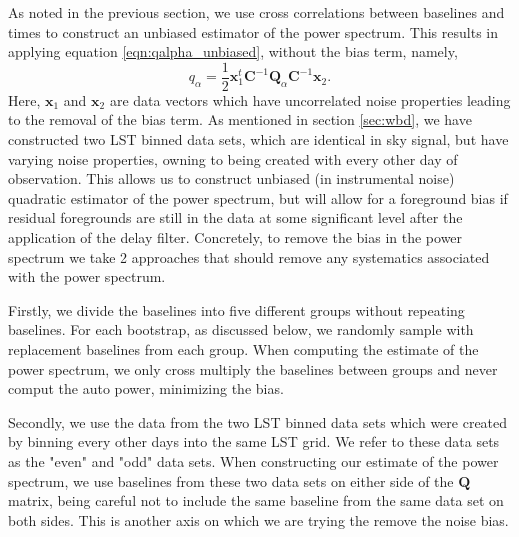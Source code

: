 \documentclass[twocolumn,numberedappendix]{emulateapj} \shorttitle{PSA64}
\newcommand{\x}{\mathbf{x}} \newcommand{\xhat}{\hat{\mathbf{x}}}
\begin{document}
As noted in the previous section, we use cross correlations between baselines
and times to construct an unbiased estimator of the power spectrum. This results
in applying equation \ref{eqn:qalpha_unbiased}, without the bias term, namely, 
\begin{equation}
\label{eqn:qalpha_nobias}
    q_{\alpha} =
        \frac{1}{2}\x_{1}^{t}\mathbf{C}^{-1}\mathbf{Q}_{\alpha}\mathbf{C}^{-1}\x_{2}.
\end{equation}
Here, $\x_{1}$ and $\x_{2}$ are data vectors which have uncorrelated noise
properties leading to the removal of the bias term. As mentioned in section
\ref{sec:wbd}, we have constructed two LST binned data sets, which are identical
in sky signal, but have varying noise properties, owning to being created with
every other day of observation.  This allows us to construct unbiased (in
instrumental noise) quadratic estimator of the power spectrum, but will allow
for a foreground bias if residual foregrounds are still in the data at some
significant level after the application of the delay filter. Concretely, to
remove the bias in the power spectrum we take 2 approaches that should remove
any systematics associated with the power spectrum.


Firstly, we divide the baselines into five different groups without repeating
baselines. For each bootstrap, as discussed below, we randomly sample with
replacement baselines from each group. When computing the estimate of the power
spectrum, we only cross multiply the baselines between groups and never comput
the auto power, minimizing the bias.

Secondly, we use the data from the two LST binned data sets which were created
by binning every other days into the same LST grid. We refer to these data sets
as the "even" and "odd" data sets. When constructing our estimate of the power
spectrum, we use baselines from these two data sets on either side of the
$\mathbf{Q}$ matrix, being careful not to include the same baseline from the
same data set on both sides. This is another axis on which we are trying the
remove the noise bias.
\end{document}
